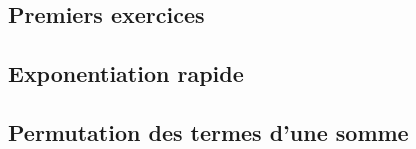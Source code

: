

\usepackage{parcolumns}
\setlength{\parindent}{0pt}

 

\subsection{Premiers exercices}


\subsection{Exponentiation rapide}


\subsection{Permutation des termes d'une somme}


